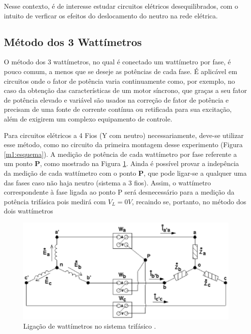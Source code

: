\documentclass[a4paper,12pt,oneside,openany,table,xcdraw]{article}
\begin{document}
Nesse contexto, é de interesse estudar circuitos elétricos desequilibrados, com o intuito de verficar os efeitos do deslocamento do neutro na rede elétrica. 

\vspace{0.2cm}
\subsection{Método dos 3 Wattímetros}
O método dos 3 wattímetros, no qual é conectado um wattímetro por fase, é pouco comum, a menos que se deseje as potências de cada fase. É aplicável em circuitos onde o fator de potência varia continuamente como, por exemplo, no caso da obtenção das características de um motor síncrono, que graças a seu fator de potência elevado e variável são usados na correção de fator de
potência e precisam de uma fonte de corrente contínua ou retificada para sua excitação, além de
exigirem um complexo equipamento de controle. 

Para circuitos elétricos a 4 Fios ($\mathrm{Y}$ com neutro) necessariamente, deve-se utilizar esse método, como no circuito da primeira montagem desse experimento (Figura \ref{m1:esquema}). A medição de potência de cada wattímetro por fase referente a um ponto $\mathbf{P}$, como mostrado na Figura \ref{intro:fig2}. Ainda é possível provar a indepência da medição de cada wattímetro com o ponto $\mathbf{P}$, que pode ligar-se a qualquer uma das fases caso não haja neutro (sistema a 3 fios). Assim, o wattímetro correspondente à fase ligada ao ponto P será desnecessário para a medição da potência trifásica pois medirá com $V_L=0V$, recaindo se, portanto, no método dos dois wattímetros

\vspace{0.3cm}
\begin{figure}[H]
\centering
\includegraphics[width=13cm]{3Watt}
\caption{Ligação de wattímetros no sistema trifásico \cite{PH}.}
\label{intro:fig2}
\end{figure}
\vspace{0.2cm}
\end{document}
